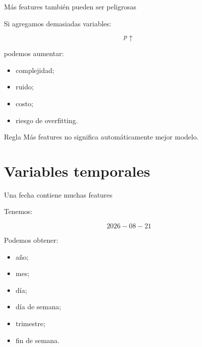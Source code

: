 \documentclass[aspectratio=169,11pt]{beamer}
\begin{document}
\begin{frame}{Más features también pueden ser peligrosas}

Si agregamos demasiadas variables:

\[
p\uparrow
\]

podemos aumentar:

\begin{itemize}

    \item complejidad;

    \item ruido;

    \item costo;

    \item riesgo de overfitting.

\end{itemize}

\vspace{0.4cm}

\begin{block}{Regla}
Más features no significa automáticamente mejor modelo.
\end{block}

\end{frame}

\section{Variables temporales}

\begin{frame}{Una fecha contiene muchas features}

Tenemos:

\[
2026-08-21
\]

Podemos obtener:

\begin{itemize}

    \item año;

    \item mes;

    \item día;

    \item día de semana;

    \item trimestre;

    \item fin de semana.

\end{itemize}

\end{frame}
\end{document}
